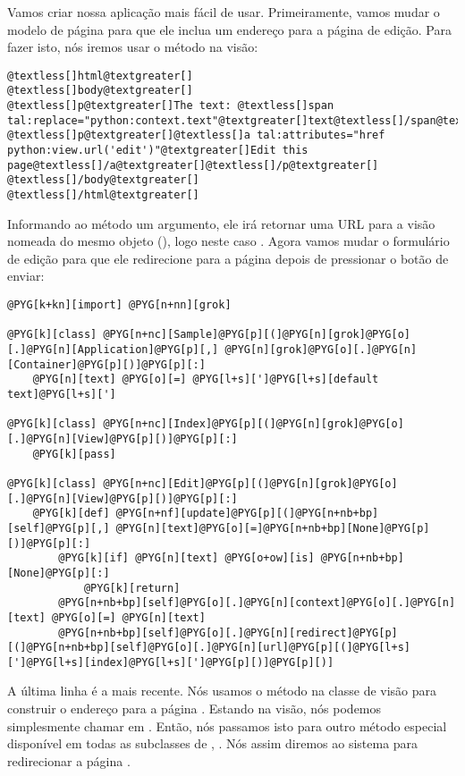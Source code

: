 \documentclass[a4paper,12pt,portuguese]{manual}
\begin{document}
Vamos criar nossa aplicação mais fácil de usar. Primeiramente, vamos
mudar o modelo de página  para que ele inclua um endereço
para a página de edição. Para fazer isto, nós iremos usar o método
 na visão:

\begin{Verbatim}[commandchars=@\[\]]
@textless[]html@textgreater[]
@textless[]body@textgreater[]
@textless[]p@textgreater[]The text: @textless[]span tal:replace="python:context.text"@textgreater[]text@textless[]/span@textgreater[]@textless[]/p@textgreater[]
@textless[]p@textgreater[]@textless[]a tal:attributes="href python:view.url('edit')"@textgreater[]Edit this page@textless[]/a@textgreater[]@textless[]/p@textgreater[]
@textless[]/body@textgreater[]
@textless[]/html@textgreater[]
\end{Verbatim}

Informando ao método  um argumento, ele irá retornar uma URL para a
visão nomeada do mesmo objeto (), logo neste caso
.
Agora vamos mudar o formulário de edição para que ele redirecione para
a página  depois de pressionar o botão de enviar:

\begin{Verbatim}[commandchars=@\[\]]
@PYG[k+kn][import] @PYG[n+nn][grok]

@PYG[k][class] @PYG[n+nc][Sample]@PYG[p][(]@PYG[n][grok]@PYG[o][.]@PYG[n][Application]@PYG[p][,] @PYG[n][grok]@PYG[o][.]@PYG[n][Container]@PYG[p][)]@PYG[p][:]
    @PYG[n][text] @PYG[o][=] @PYG[l+s][']@PYG[l+s][default text]@PYG[l+s][']

@PYG[k][class] @PYG[n+nc][Index]@PYG[p][(]@PYG[n][grok]@PYG[o][.]@PYG[n][View]@PYG[p][)]@PYG[p][:]
    @PYG[k][pass]

@PYG[k][class] @PYG[n+nc][Edit]@PYG[p][(]@PYG[n][grok]@PYG[o][.]@PYG[n][View]@PYG[p][)]@PYG[p][:]
    @PYG[k][def] @PYG[n+nf][update]@PYG[p][(]@PYG[n+nb+bp][self]@PYG[p][,] @PYG[n][text]@PYG[o][=]@PYG[n+nb+bp][None]@PYG[p][)]@PYG[p][:]
        @PYG[k][if] @PYG[n][text] @PYG[o+ow][is] @PYG[n+nb+bp][None]@PYG[p][:]
            @PYG[k][return]
        @PYG[n+nb+bp][self]@PYG[o][.]@PYG[n][context]@PYG[o][.]@PYG[n][text] @PYG[o][=] @PYG[n][text]
        @PYG[n+nb+bp][self]@PYG[o][.]@PYG[n][redirect]@PYG[p][(]@PYG[n+nb+bp][self]@PYG[o][.]@PYG[n][url]@PYG[p][(]@PYG[l+s][']@PYG[l+s][index]@PYG[l+s][']@PYG[p][)]@PYG[p][)]
\end{Verbatim}

A última linha é a mais recente. Nós usamos o método  na
classe de visão para construir o endereço para a página .
Estando na visão, nós podemos simplesmente chamar  em
. Então, nós passamos isto para outro método especial
disponível em todas as subclasses de , . Nós
assim diremos ao sistema para redirecionar a página .
\end{document}
